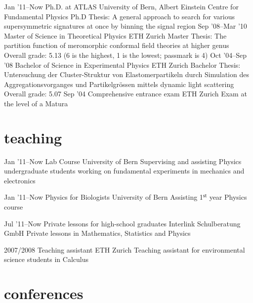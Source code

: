 \documentclass[]{cv} %
\begin{document}
\begin{entrylist}
\entry
{Jan '11--Now}
{Ph.D. {\normalfont at} ATLAS}
{University of Bern, Albert Einstein Centre for Fundamental Physics}
{Ph.D Thesis: A general approach to search for various supersymmetric signatures at once by binning the signal region}
\entry
{Sep '08--Mar '10}
{Master {\normalfont of Science in} Theoretical Physics}
{ETH Zurich}
{Master Thesis: The partition function of meromorphic conformal field theories at higher genus\\
Overall grade: 5.13 (6 is the highest, 1 is the lowest; passmark is 4)}
\entry
{Oct '04--Sep '08}
{Bachelor {\normalfont of Science in} Experimental Physics}
{ETH Zurich}
{Bachelor Thesis: Untersuchung der Cluster-Struktur von Elastomerpartikeln durch Simulation des Aggregationsvorganges und Partikelgr{\"o}ssen mittels dynamic
light scattering\\
Overall grade: 5.07}
\entry
{Sep '04}
{Comprehensive entrance exam}
{ETH Zurich}
{Exam at the level of a Matura}
\end{entrylist}

\section{teaching}

\begin{entrylist}

\entry
{Jan '11--Now}
{Lab Course}
{University of Bern}
{Supervising and assisting Physics undergraduate students working on fundamental experiments in mechanics and electronics}

\entry
{Jan '11--Now}
{Physics for Biologists}
{University of Bern}
{Assisting 1$^\mathsf{st}$ year Physics course}

\entry
{Jul '11--Now}
{Private lessons for high-school graduates}
{Interlink Schulberatung GmbH}
{Private lessons in Mathematics, Statistics and Physics}

\entry
{2007/2008}
{Teaching assistant}
{ETH Zurich}
{Teaching assistant for environmental science students in Calculus}

\end{entrylist}

\section{conferences}
\end{document}
